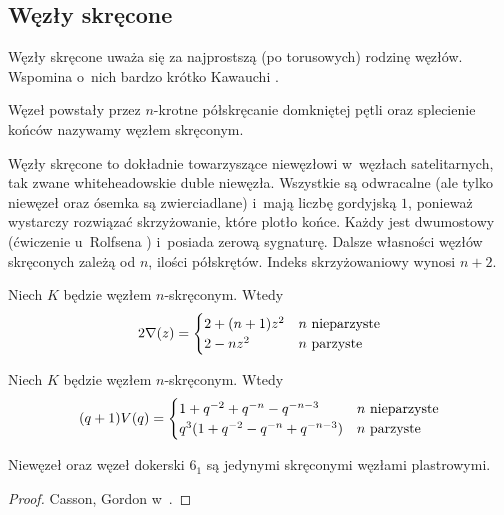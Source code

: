 
\subsection{Węzły skręcone}
%

Węzły skręcone uważa się za najprostszą (po torusowych) rodzinę węzłów.
Wspomina o~nich bardzo krótko Kawauchi \cite[s. 31]{kawauchi96}.

\begin{definition}
    Węzeł powstały przez $n$-krotne półskręcanie domkniętej pętli oraz splecienie końców nazywamy węzłem skręconym.
\end{definition}

Węzły skręcone to dokładnie towarzyszące niewęzłowi w~węzłach satelitarnych, tak zwane whiteheadowskie duble niewęzła.
Wszystkie są odwracalne (ale tylko niewęzeł oraz ósemka są zwierciadlane) i~mają liczbę gordyjską $1$, ponieważ wystarczy rozwiązać skrzyżowanie, które plotło końce.
%
Każdy jest dwumostowy (ćwiczenie u~Rolfsena \cite[s. 114]{rolfsen76}) i~posiada zerową sygnaturę.
%
%
Dalsze własności węzłów skręconych zależą od $n$, ilości półskrętów.
Indeks skrzyżowaniowy wynosi $n + 2$.

\begin{proposition}
%
    Niech $K$ będzie węzłem $n$-skręconym.
    Wtedy
    \begin{equation}
    2 \nabla (z) = \begin{cases}
        2 + (n+1) z^{2} & n \mbox{ nieparzyste} \\
        2 - nz^2 & n \mbox{ parzyste}
    \end{cases}
    \end{equation}
\end{proposition}

\begin{proposition}
%
    Niech $K$ będzie węzłem $n$-skręconym.
    Wtedy
    \begin{equation}
    (q+1)V(q) = \begin{cases}
        1+q^{-2}+q^{-n}-q^{-n-3} & n \mbox{ nieparzyste} \\
        q^3(1+q^{-2}-q^{-n}+q^{-n-3}) & n \mbox{ parzyste}
    \end{cases}
    \end{equation}
\end{proposition}

\begin{proposition}
%
    Niewęzeł oraz węzeł dokerski $6_1$ są jedynymi skręconymi węzłami plastrowymi.
\end{proposition}

\begin{proof}
    Casson, Gordon w~\cite{casson86}.
\end{proof}

%


